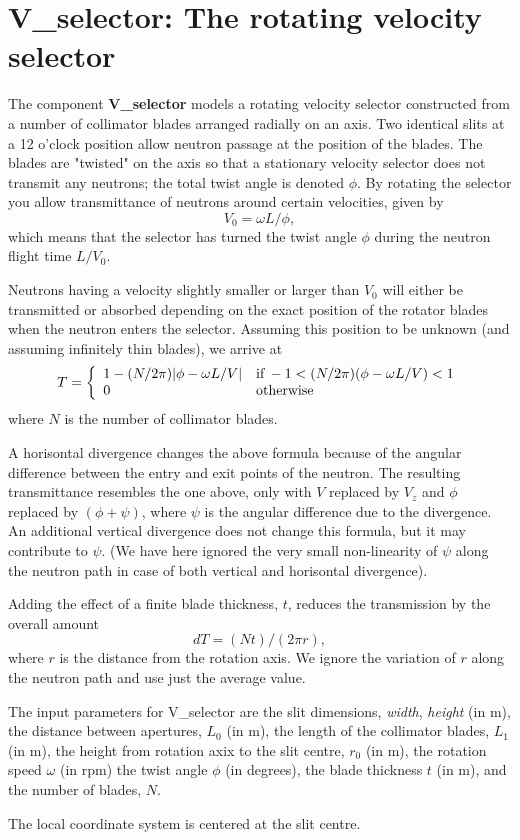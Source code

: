 \section{V\_selector: The rotating velocity selector}

The component {\bf V\_selector} models a rotating velocity
selector constructed from a number of collimator blades
arranged radially on an axis. Two identical slits 
at a 12 o'clock position allow
neutron passage at the position of the blades.
The blades are "twisted" on the axis so that a stationary 
velocity selector does not transmit any neutrons; the total
twist angle is denoted $\phi$.
By rotating the selector you allow 
transmittance of neutrons around certain velocities, given by
\begin{equation}
V_0 = \omega L / \phi ,
\end{equation}
which means that the selector has turned the twist angle
$\phi$ during the neutron flight time $L/V_0$.

Neutrons having a velocity slightly smaller or larger than $V_0$ 
will either be transmitted or absorbed depending on the exact position
of the rotator blades when the neutron enters the selector.
Assuming this position to be unknown (and assuming infinitely
thin blades), we arrive at
\begin{equation}
T = \left\{ 
 \begin{array}{ll}
 1 - (N/2\pi ) |\phi-\omega L / V| & 
        {\rm if}\,  -1 < (N/2\pi )(\phi -\omega L / V) < 1 \\
    0  &  {\rm otherwise}
 \end{array} \right.
\end{equation}
where $N$ is the number of collimator blades. 

A horisontal divergence changes the above formula because of the
angular difference between the entry and exit points of the neutron.
The resulting transmittance resembles the one above, only with 
$V$ replaced by $V_z$ and $\phi$ replaced by $(\phi +\psi )$, 
where $\psi$ is the angular difference due to
the divergence. An additional vertical divergence does not change 
this formula, but it may contribute to $\psi$.
(We have here ignored the very small non-linearity of $\psi$ along the
neutron path in case of both vertical and horisontal divergence).

Adding the effect of a finite blade thickness, $t$, reduces the transmission
by the overall amount
\begin{equation}
dT = (N t) / (2\pi r ) ,
\end{equation}
where $r$ is the distance from the rotation axis. We ignore the variation
of $r$ along the neutron path and use just the average value.

The input parameters for V\_selector are the slit dimensions,
\textit{width}, \textit{height} (in m),
the distance between apertures, $L_0$ (in m), the length of the 
collimator blades, $L_1$ (in m), the height from rotation axix to the slit
centre, $r_0$ (in m), the rotation speed $\omega$ (in rpm)
the twist angle $\phi$ (in degrees), the blade thickness $t$ (in m),
and the number of blades, $N$.

The local coordinate system is centered at the slit centre.

